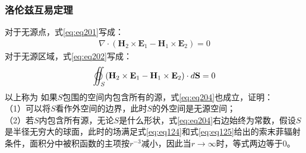 \documentclass{article}
\numberwithin{equation}{section}
\begin{document}
\subsubsection{洛伦兹互易定理}
对于无源点，式\ref{eq:eq201}写成：
\begin{align}
    \label{eq:eq203}
    \nabla\cdot(\mathbf{H}_2\times\mathbf{E}_1-\mathbf{H}_1\times\mathbf{E}_2)=0
\end{align}
对于无源区域，式\ref{eq:eq202}写成：
\begin{align}
    \label{eq:eq204}
    \varoiint_S(\mathbf{H}_2\times\mathbf{E}_1-\mathbf{H}_1\times\mathbf{E}_2)\cdot d\mathbf{S}=0
\end{align}
以上称为\textbf{\color{blue}{洛伦兹互易定理}}
如果$S$包围的空间内包含所有的源，式\ref{eq:eq204}也成立，证明：\\
（1）可以将$S$看作外空间的边界，此时$S$的外空间是无源空间；\\
（2）若$S$内包含所有源，无论$S$是什么形状，式\ref{eq:eq204}右边始终为常数，假设$S$是半径无穷大的球面，此时的场满足式\ref{eq:eq124}和式\ref{eq:eq125}给出的索末菲辐射条件，面积分中被积函数的主项按$r^{-3}$减小，因此当$r\to\infty$时，等式两边等于0。
\end{document}
